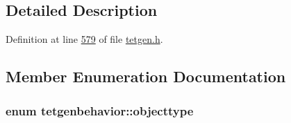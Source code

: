 \subsection{Detailed Description}


Definition at line \hyperlink{tetgen_8h_source_l00579}{579} of file \hyperlink{tetgen_8h_source}{tetgen.\+h}.



\subsection{Member Enumeration Documentation}
\subsubsection[{\texorpdfstring{objecttype}{objecttype}}]{\setlength{\rightskip}{0pt plus 5cm}enum {\bf tetgenbehavior\+::objecttype}}\hypertarget{classtetgenbehavior_aeea08e7334fde4251b74a8247bcc54b8}{}\label{classtetgenbehavior_aeea08e7334fde4251b74a8247bcc54b8}

